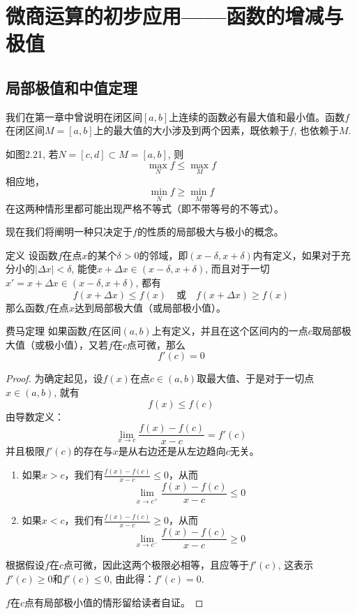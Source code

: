 \section{微商运算的初步应用——函数的增减与极值}
\subsection{局部极值和中值定理}
我们在第一章中曾说明在闭区间$[a,b]$上连续的函数必有最大值和最小值。函数$f$在闭区间$M=[a,b]$上的最大值的大小涉及到两个因素，既依赖于$f$, 也依赖于$M$.

如图2.21, 若$N=[c,d]\subset M=[a,b]$, 则
\[\max_N f\le \max_M f\]
相应地，
\[\min_N f\ge \min_M f\]
在这两种情形里都可能出现严格不等式（即不带等号的不等式）。

\begin{figure}[htp]
    \centering
\begin{tikzpicture}[>=latex]

\end{tikzpicture}
    \caption{}
\end{figure}

现在我们将阐明一种只决定于$f$的性质的局部极大与极小的概念。

\begin{blk}
    {定义} 设函数$f$在点$x$的某个$\delta>0$的邻域，即$(x-\delta,x+\delta)$内有定义，如果对于充分小的$|\Delta x|<\delta$, 能使$x+\Delta x\in (x-\delta,x+\delta)$, 而且对于一切$x'=x+\Delta x\in (x-\delta,x+\delta)$, 都有
\[f(x+\Delta x)\le f(x)\quad \text{或}\quad f(x+\Delta x)\ge f(x)\]
那么函数$f$在点$x$达到局部极大值（或局部极小值）。
\end{blk}

\begin{blk}
    {费马定理} 如果函数$f$在区间$(a,b)$上有定义，并且在这个区间内的一点$c$取局部极大值（或极小值），又若$f$在$c$点可微，那么
    \[f' (c) =0\]
\end{blk}

\begin{proof}
    为确定起见，设$f(x)$在点$c\in (a,b)$取最大值、于是对于一切点$x\in (a,b)$, 就有
\[f (x) \le f (c) \]
由导数定义：
\[\lim_{x\to c}\frac{f (x) -f (c)}{x-c} =f' (c) \]
并且极限$f'(c)$的存在与$x$是从右边还是从左边趋向$c$无关。
\begin{enumerate}
    \item 如果$x>c$，我们有$\frac{f (x) -f (c)}{x-c}\le 0$，从而
\[\lim_{x\to c^+}\frac{f (x) -f (c)}{x-c}\le 0\]
\item 如果$x<c$，我们有$\frac{f (x) -f (c)}{x-c}\ge 0$，从而
\[\lim_{x\to c^-}\frac{f (x) -f (c)}{x-c}\ge 0\]
\end{enumerate}
根据假设$f$在$c$点可微，因此这两个极限必相等，且应等于$f'(c)$, 这表示$f'(c)\ge 0$和$f'(c)\le 0$, 由此得：$f' (c) =0$.

$f$在$c$点有局部极小值的情形留给读者自证。
\end{proof}

